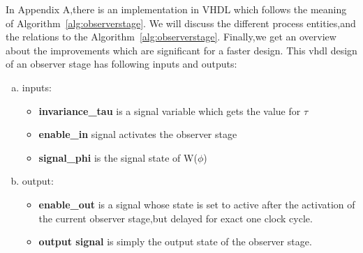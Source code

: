 In Appendix A,there is an implementation in VHDL which follows the meaning of Algorithm~\ref{alg:observerstage}.
We will discuss the different process entities,and the relations to the Algorithm~\ref{alg:observerstage}.
Finally,we get an overview about the improvements which are significant for a faster design. 
This vhdl design of an observer stage has following inputs and outputs:
\begin{enumerate}[(a)]
\item inputs:
\begin{itemize}
\item \textbf{invariance\_tau} is a signal variable which gets the value for $\tau$
\item \textbf{enable\_in} signal activates the observer stage
\item \textbf{signal\_phi} is the signal state of W($\phi$)
\end{itemize}
\newpage
\item output:
\begin{itemize}
\item \textbf{enable\_out} is a signal whose state is set to active after the activation of the current observer stage,but delayed for exact one clock cycle.   
\item \textbf{output signal} is simply the output state of the observer stage.
\end{itemize}
\end{enumerate}

